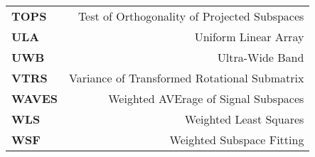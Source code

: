 \begin{latin}
\begin{center}
\begin{tabular*}{\textwidth}{@{\extracolsep{\fill} }>{\bfseries}lr}
 {TOPS}&  Test of Orthogonality of Projected Subspaces\\
 {ULA}&  Uniform Linear Array\\
 {UWB}&  Ultra-Wide Band\\
 {VTRS}&  Variance of Transformed Rotational Submatrix\\
 {WAVES}& Weighted AVErage of Signal Subspaces\\
 {WLS}&  Weighted Least Squares\\
 {WSF}&  Weighted Subspace Fitting\\
\end{tabular*}
\end{center}
\end{latin}
\newpage